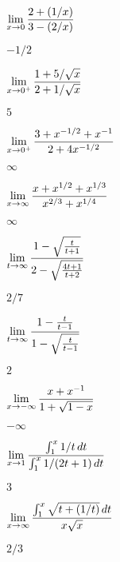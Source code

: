 \begin{exercises}
\begin{exercise} $\displaystyle\lim_{x\to 0}{2+(1/x)\over 3-(2/x)}$
\begin{answer} $-1/2$
\end{answer}\end{exercise}

\begin{exercise} $\displaystyle\lim_{x\to 0^+}{1+5/\sqrt{x}\over 2+1/\sqrt{x}}$
\begin{answer} $5$
\end{answer}\end{exercise}

\begin{exercise} $\displaystyle\lim_{x\to 0^+}{3+x^{-1/2}+x^{-1}\over 2+4x^{-1/2}}$
\begin{answer} $\infty$
\end{answer}\end{exercise}

\begin{exercise} $\displaystyle\lim_{x\to\infty}{x+x^{1/2}+x^{1/3}\over x^{2/3}+x^{1/4}}$
\begin{answer} $\infty$
\end{answer}\end{exercise}

\begin{exercise} $\displaystyle\lim_{t\to\infty}
{1-\sqrt{t\over t+1}\over 2-\sqrt{4t+1\over t+2}}$
\begin{answer} $2/7$
\end{answer}\end{exercise}

\begin{exercise} $\displaystyle\lim_{t\to\infty}{1-{t\over t-1}\over 1-\sqrt{t\over t-1}}$
\begin{answer} $2$
\end{answer}\end{exercise}

\begin{exercise} $\displaystyle\lim_{x\to-\infty}{x+x^{-1}\over 1+\sqrt{1-x}}$
\begin{answer} $-\infty$
\end{answer}\end{exercise}

\begin{exercise} $\displaystyle\lim_{x\to1}{\int_1^x 1/t\,dt\over\int_1^x 1/(2t+1)\,dt}$
\begin{answer} $3$
\end{answer}\end{exercise}

\begin{exercise} $\displaystyle\lim_{x\to\infty}{\int_1^x\sqrt{t+(1/t)}\,dt\over x\sqrt{x}}$
\begin{answer} $2/3$
\end{answer}\end{exercise}


\end{exercises}

